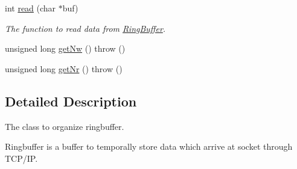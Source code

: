\begin{DoxyCompactItemize}
int \hyperlink{class_l_s_t_d_a_q_1_1_ring_buffer_a589fb1045d27590cca235e01f313d1e8}{read} (char $\ast$buf)
\begin{DoxyCompactList}\small\item\em The function to read data from \hyperlink{class_l_s_t_d_a_q_1_1_ring_buffer}{Ring\+Buffer}. \end{DoxyCompactList}\item 
unsigned long \hyperlink{class_l_s_t_d_a_q_1_1_ring_buffer_ac2bbd20a28f7dcf14388648f0eb092cd}{get\+Nw} ()  throw ()
\item 
unsigned long \hyperlink{class_l_s_t_d_a_q_1_1_ring_buffer_a9d7d68084f66a4fc1c6279171b778807}{get\+Nr} ()  throw ()
\end{DoxyCompactItemize}


\subsection{Detailed Description}
The class to organize ringbuffer. 

Ringbuffer is a buffer to temporally store data which arrive at socket through T\+C\+P/\+I\+P.


